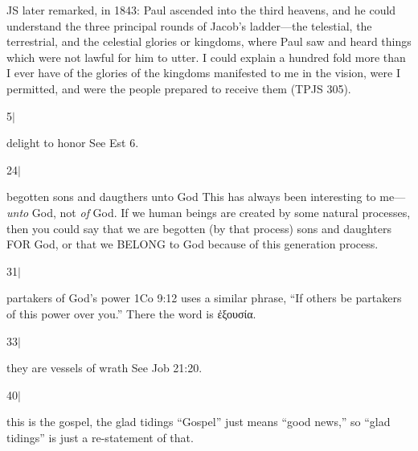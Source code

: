 		JS later remarked, in 1843:
			Paul ascended into the third heavens, and he could understand the three principal rounds of Jacob's ladder---the telestial, the terrestrial, and the celestial glories or kingdoms, where Paul saw and heard things which were not lawful for him to utter. I could explain a hundred fold more than I ever have of the glories of the kingdoms manifested to me in the vision, were I permitted, and were the people prepared to receive them (TPJS 305).
	
		\begin{compactdesc}
		
		\item[5$\vert$]
		\begin{compactdesc}
		\item[delight to honor] See Est 6.
		\end{compactdesc}
		
		\item[24$\vert$] %
		\begin{compactdesc}
		\item[begotten sons and daugthers unto God] This has always been interesting to me---\textit{unto} God, not \textit{of} God. If we human beings are created by some natural processes, then you could say that we are begotten (by that process) sons and daughters FOR God, or that we BELONG to God because of this generation process. 
		\end{compactdesc}
		
		\item[31$\vert$] %
		\begin{compactdesc}
		\item[partakers of God's power] 1Co 9:12 uses a similar phrase, ``If others be partakers of this power over you.'' There the word is \textgreek{ἐξουσία}.
		\end{compactdesc}
		
		\item[33$\vert$]
		\begin{compactdesc}
		\item[they are vessels of wrath] See Job 21:20.
		\end{compactdesc}
		
		\item[40$\vert$]
		\begin{compactdesc}
		\item[this is the gospel, the glad tidings] ``Gospel'' just means ``good news,'' so ``glad tidings'' is just a re-statement of that.
		\end{compactdesc}
		

\end{compactdesc}
